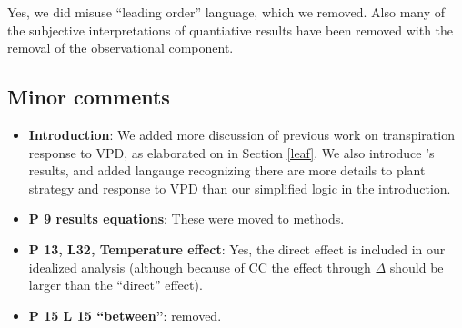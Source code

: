 \documentclass[12pt]{article}
\begin{document}
Yes, we did misuse ``leading order'' language, which we removed. Also many
of the subjective interpretations of quantiative results have been
removed with the removal of the observational component.

\subsection{Minor comments}

\begin{itemize}
  \item \textbf{Introduction}: We added more discussion of previous
    work on transpiration response to VPD, as elaborated on in Section
    \ref{leaf}. We also introduce \cite{Novick_2016}'s results, and
    added langauge recognizing there are more details to plant strategy
    and response to VPD than our simplified logic in the introduction.
  \item \textbf{P 9 results equations}: These were moved to methods.
  \item \textbf{P 13, L32, Temperature effect}: Yes, the direct effect is
    included in our idealized analysis (although because of CC the
    effect through $\Delta$ should be larger than the ``direct''
    effect).
  \item \textbf{P 15 L 15 ``between''}: removed.
\end{itemize}


\end{document}
